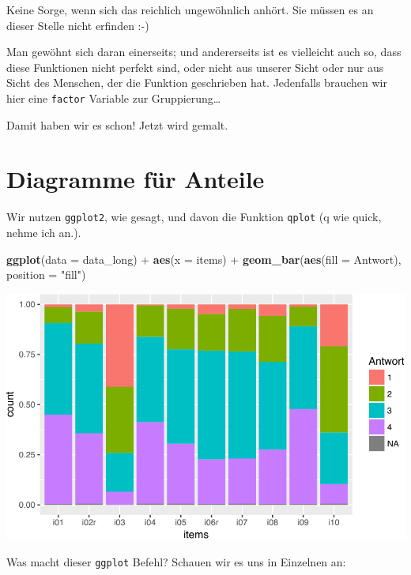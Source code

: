 \documentclass[12pt,ngerman,]{book}
\newenvironment{Shaded}{\begin{snugshade}}{\end{snugshade}}
\newcommand{\KeywordTok}[1]{\textcolor[rgb]{0.13,0.29,0.53}{\textbf{{#1}}}}
\newcommand{\DataTypeTok}[1]{\textcolor[rgb]{0.13,0.29,0.53}{{#1}}}
\newcommand{\StringTok}[1]{\textcolor[rgb]{0.31,0.60,0.02}{{#1}}}
\newcommand{\NormalTok}[1]{{#1}}
\renewenvironment{Shaded}{\begin{kframe}}{\end{kframe}}
\begin{document}
Keine Sorge, wenn sich das reichlich ungewöhnlich anhört. Sie müssen es
an dieser Stelle nicht erfinden :-)

Man gewöhnt sich daran einerseits; und andererseits ist es vielleicht
auch so, dass diese Funktionen nicht perfekt sind, oder nicht aus
unserer Sicht oder nur aus Sicht des Menschen, der die Funktion
geschrieben hat. Jedenfalls brauchen wir hier eine \texttt{factor}
Variable zur Gruppierung\ldots{}

Damit haben wir es schon! Jetzt wird gemalt.

\section{Diagramme für Anteile}\label{diagramme-fur-anteile}

Wir nutzen \texttt{ggplot2}, wie gesagt, und davon die Funktion
\texttt{qplot} (q wie quick, nehme ich an.).

\begin{Shaded}
\begin{Highlighting}[]
\KeywordTok{ggplot}\NormalTok{(}\DataTypeTok{data =} \NormalTok{data_long) +}
\StringTok{  }\KeywordTok{aes}\NormalTok{(}\DataTypeTok{x =} \NormalTok{items)  +}
\StringTok{  }\KeywordTok{geom_bar}\NormalTok{(}\KeywordTok{aes}\NormalTok{(}\DataTypeTok{fill =} \NormalTok{Antwort), }\DataTypeTok{position =} \StringTok{"fill"}\NormalTok{) }
\end{Highlighting}
\end{Shaded}

\begin{center}\includegraphics[width=0.7\linewidth]{056_Fallstudie_Visualisierung_files/figure-latex/unnamed-chunk-7-1} \end{center}

Was macht dieser \texttt{ggplot} Befehl? Schauen wir es uns in Einzelnen
an:
\end{document}
